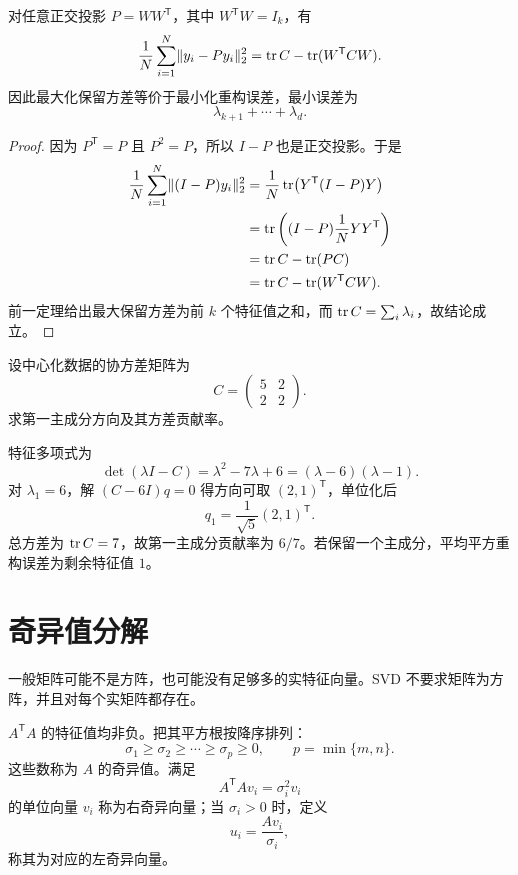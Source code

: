 \begin{theorem}
对任意正交投影 $P=WW^{\mathsf T}$，其中 $W^{\mathsf T}W=I_k$，有
\[
\frac1N\sum_{i=1}^N\lVert y_i-Py_i\rVert_2^2
=\operatorname{tr} C-\operatorname{tr}(W^{\mathsf T}CW).
\]
因此最大化保留方差等价于最小化重构误差，最小误差为
\[
\lambda_{k+1}+\cdots+\lambda_d.
\]
\end{theorem}
\begin{proof}
因为 $P^{\mathsf T}=P$ 且 $P^2=P$，所以 $I-P$ 也是正交投影。于是
\begin{align*}
\frac1N\sum_{i=1}^N\lVert(I-P)y_i\rVert_2^2
&=\frac1N\operatorname{tr}\bigl(Y^{\mathsf T}(I-P)Y\bigr)\\
&=\operatorname{tr}\left((I-P)\frac1NYY^{\mathsf T}\right)\\
&=\operatorname{tr} C-\operatorname{tr}(PC)\\
&=\operatorname{tr} C-\operatorname{tr}(W^{\mathsf T}CW).
\end{align*}
前一定理给出最大保留方差为前 $k$ 个特征值之和，而 $\operatorname{tr} C=\sum_i\lambda_i$，故结论成立。
\end{proof}

\begin{example}[title={二维数据的主成分}]
设中心化数据的协方差矩阵为
\[
C=\begin{pmatrix}5&2\\2&2\end{pmatrix}.
\]
求第一主成分方向及其方差贡献率。
\begin{solution}
特征多项式为
\[
\det(\lambda I-C)=\lambda^2-7\lambda+6
=(\lambda-6)(\lambda-1).
\]
对 $\lambda_1=6$，解 $(C-6I)q=0$ 得方向可取 $(2,1)^{\mathsf T}$，单位化后
\[
q_1=\frac1{\sqrt5}(2,1)^{\mathsf T}.
\]
总方差为 $\operatorname{tr} C=7$，故第一主成分贡献率为 $6/7$。若保留一个主成分，平均平方重构误差为剩余特征值 $1$。
\end{solution}
\end{example}

\section{奇异值分解}

一般矩阵可能不是方阵，也可能没有足够多的实特征向量。SVD 不要求矩阵为方阵，并且对每个实矩阵都存在。

\begin{definition}[奇异值与奇异向量]
$A^{\mathsf T}A$ 的特征值均非负。把其平方根按降序排列：
\[
\sigma_1\ge\sigma_2\ge\cdots\ge\sigma_p\ge0,
\qquad p=\min\{m,n\}.
\]
这些数称为 $A$ 的奇异值。满足
\[
A^{\mathsf T}Av_i=\sigma_i^2v_i
\]
的单位向量 $v_i$ 称为右奇异向量；当 $\sigma_i>0$ 时，定义
\[
u_i=\frac{Av_i}{\sigma_i},
\]
称其为对应的左奇异向量。
\end{definition}

